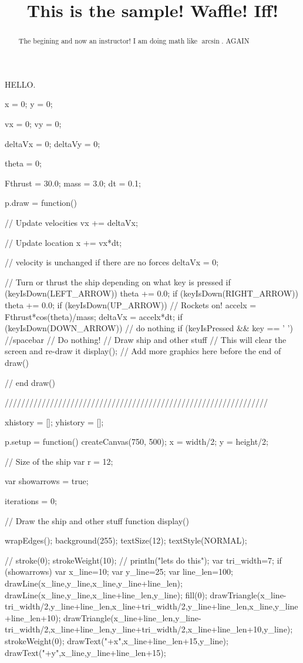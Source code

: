 \documentclass{ximera}
\title[Breal-grond]{This is the sample! Waffle!  Iff!}
\begin{document}
\begin{abstract}
  The begining and now an instructor! I am doing math like $\arcsin$. AGAIN
\end{abstract}

\maketitle

HELLO.

\begin{javascriptCode}
x = 0;
y = 0;

vx = 0;
vy = 0;

deltaVx = 0;
deltaVy = 0;

theta = 0;

Fthrust = 30.0;
mass = 3.0;
dt = 0.1;

p.draw = function() {
    // Update velocities
    vx += deltaVx;

    // Update location
    x += vx*dt;

    // velocity is unchanged if there are no forces
    deltaVx = 0;

    // Turn or thrust the ship depending on what key is pressed
    if (keyIsDown(LEFT_ARROW)) {
        theta += 0.0;
    }
    if (keyIsDown(RIGHT_ARROW)) {
        theta += 0.0;
    }
    if (keyIsDown(UP_ARROW)) {
        // Rockets on!
        accelx = Fthrust*cos(theta)/mass;
        deltaVx = accelx*dt;
    }
    if (keyIsDown(DOWN_ARROW)) {
            // do nothing
    }
    if (keyIsPressed && key == ' '){ //spacebar
        // Do nothing!
    }
    // Draw ship and other stuff
    // This will clear the screen and re-draw it
    display();
    // Add more graphics here before the end of draw()
  
} // end draw()

////////////////////////////////////////////////////////////////

xhistory = [];
yhistory = [];

p.setup = function() {
    createCanvas(750, 500);
    x = width/2;
    y = height/2;
}

// Size of the ship
var r = 12;

var showarrows = true;

iterations = 0;

// Draw the ship and other stuff
function display() {
    wrapEdges();
    background(255);
    textSize(12);
    textStyle(NORMAL);

//    stroke(0);
    strokeWeight(10);
//    println("lets do this");
    var tri_width=7;
    if (showarrows) {
            var x_line=10;
            var y_line=25;
            var line_len=100;
            drawLine(x_line,y_line,x_line,y_line+line_len);
            drawLine(x_line,y_line,x_line+line_len,y_line);
        fill(0);
        drawTriangle(x_line-tri_width/2,y_line+line_len,x_line+tri_width/2,y_line+line_len,x_line,y_line+line_len+10);
        drawTriangle(x_line+line_len,y_line-tri_width/2,x_line+line_len,y_line+tri_width/2,x_line+line_len+10,y_line);
            strokeWeight(0);
            drawText("+x",x_line+line_len+15,y_line);
            drawText("+y",x_line,y_line+line_len+15);
    }

}
\end{javascriptCode}
\end{document}
